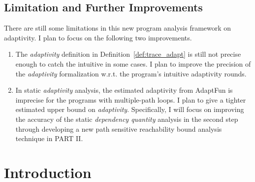 \documentclass[a4paper,11pt]{article}
\newcommand{\THESYSTEM}{\textsf{AdaptFun}}
\begin{document}
\subsection{Limitation and Further Improvements}
\label{sec:adapt-further}
There are still some limitations in this new program analysis framework on adaptivity.
I plan to focus on the following two improvements.
\begin{enumerate}
    \item The \emph{adaptivity} definition in Definition~\ref{def:trace_adapt} is still not precise enough to catch the intuitive
    in some cases.
    I plan to improve the precision of the \emph{adaptivity} formalization w.r.t. the program's intuitive adaptivity rounds.
\item In static \emph{adaptivity} analysis, the estimated adaptivity from {\THESYSTEM} is imprecise for the programs with
multiple-path loops.
I plan to give a tighter estimated upper bound on \emph{adaptivity}.
Specifically, I will focus on improving the accuracy of the static \emph{dependency quantity} analysis in the second step through 
developing a new path sensitive reachability bound analysis technique in PART II. 
\end{enumerate}

\section*{}
%

\section{Introduction}
\label{sec:reachability-intro}

\end{document}
